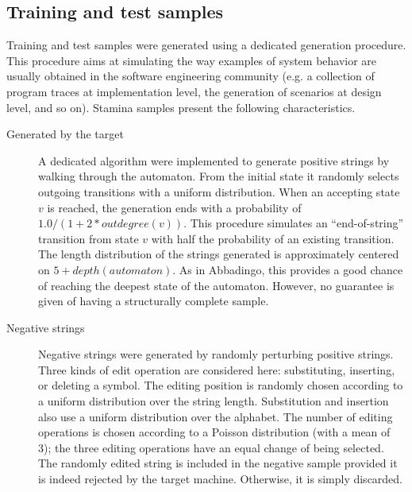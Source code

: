 \subsection{Training and test samples\label{subsection:stamina-samples}}

Training and test samples were generated using a dedicated generation procedure. This procedure aims at simulating the way examples of system behavior are usually obtained in the software engineering community (e.g. a collection of program traces at implementation level, the generation of scenarios at design level, and so on). Stamina samples present the following characteristics.

\begin{description}

\item[Generated by the target] A dedicated algorithm were implemented to generate positive strings by walking through the automaton. From the initial state it randomly selects outgoing transitions with a uniform distribution. When an accepting state $v$ is reached, the generation ends with a probability of $1.0/(1 + 2*outdegree(v))$. This procedure simulates an ``end-of-string'' transition from state $v$ with half the probability of an existing transition. The length distribution of the strings generated is approximately centered on $5 + depth(automaton)$. As in Abbadingo, this provides a good chance of reaching the deepest state of the automaton. However, no guarantee is given of having a structurally complete sample.

\item[Negative strings] Negative strings were generated by randomly perturbing positive strings. Three kinds of edit operation are considered here: substituting, inserting, or deleting a symbol. The editing position is randomly chosen according to a uniform distribution over the string length. Substitution and insertion also use a uniform distribution over the alphabet. The number of editing operations is chosen according to a Poisson distribution (with a mean of 3); the three editing operations have an equal change of being selected. The randomly edited string is included in the negative sample provided it is indeed rejected by the target machine. Otherwise, it is simply discarded.

\end{description}

